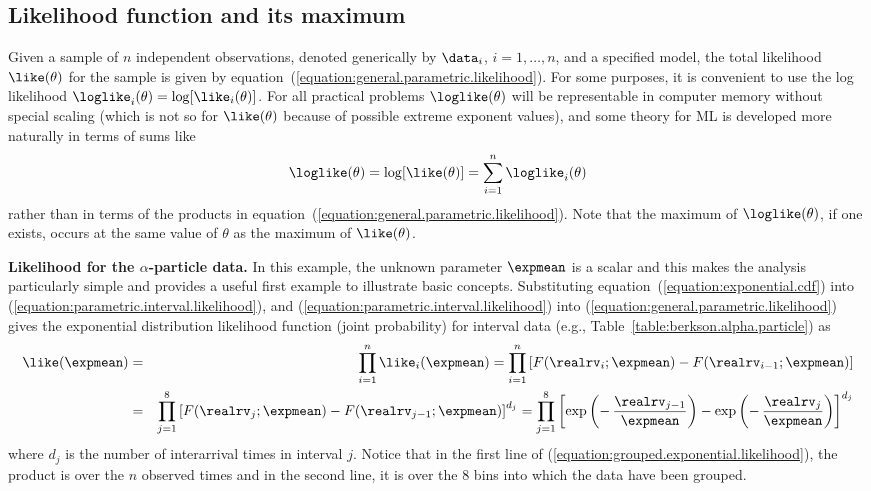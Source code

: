 \subsection{Likelihood function and its maximum}
\label{section:loglikelihood}
Given a sample of $n$ independent observations, denoted generically by
$\data_{i}$, $i=1, \ldots , n$, and a specified model, the total
likelihood $\like(\theta)$ for the sample is given by
equation~(\ref{equation:general.parametric.likelihood}).  
For some purposes, it is convenient to use the log
likelihood $\loglike_{i}(\theta) = \log[\like_{i}(\theta)]$.
For all practical problems $\loglike(\theta)$ will be
representable in computer memory without special scaling (which is not
so for $\like(\theta)$ because of possible extreme exponent
values), and some theory for ML is developed more naturally in terms of
sums like
\begin{displaymath}
\loglike(\theta) = \log[\like(\theta)] = \sum_{i=1}^{n}
\loglike_{i}(\theta)
\end{displaymath}
rather than in terms of the products
in equation~(\ref{equation:general.parametric.likelihood}). Note that the
maximum of $\loglike(\theta)$, if one exists, occurs at
the same value of $\theta$ as the maximum of
$\like(\theta)$.


\begin{example}
\label{example:alpha.likelihood}
{\bf Likelihood for the $\alpha$-particle data.}
In this example, the unknown parameter $\expmean$ is a scalar and this
makes the analysis particularly simple and provides a useful first
example to illustrate basic concepts.  Substituting
equation~(\ref{equation:exponential.cdf}) into
(\ref{equation:parametric.interval.likelihood}), and
(\ref{equation:parametric.interval.likelihood}) into
(\ref{equation:general.parametric.likelihood}) gives the exponential
distribution likelihood function (joint probability) for interval
data (e.g., Table~\ref{table:berkson.alpha.particle}) as
\begin{eqnarray}
\label{equation:grouped.exponential.likelihood}
\like(\expmean)&=& \prod_{i=1}^{n} \like_{i}(\expmean)= \prod_{i=1}^{n} 
\left [ F(\realrv_{i};\expmean)-F(\realrv_{i-1};\expmean)
 \right ] \\
             &=& \prod_{j=1}^{8} 
\left [ F(\realrv_{j};\expmean)-F(\realrv_{j-1};\expmean)
 \right ]^{d_{j}} = \prod_{j=1}^{8} \left[
\exp \left(- \,\frac{\realrv_{j-1}}{ \expmean} \right)-
\exp \left( -\,\frac{\realrv_{j}}{ \expmean} \right)
\right]^{d_{j}} 
\nonumber
\end{eqnarray}
where $d_{j}$ is the number of interarrival times in
interval $j$. Notice that in the first line of
(\ref{equation:grouped.exponential.likelihood}), the product is over
the $n$ observed times and in the second line, it is over the 8 bins into
which the data have been grouped.
\end{example}

